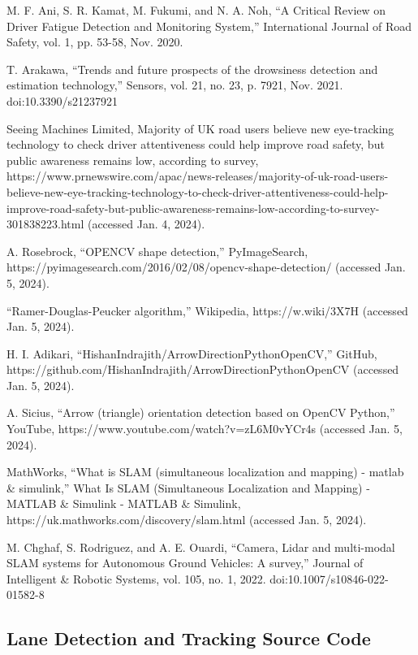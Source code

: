 \documentclass[9pt,conference]{IEEEtran}
\begin{document}
\begin{thebibliography}{00}
     M. F. Ani, S. R. Kamat, M. Fukumi, and N. A. Noh, “A Critical Review on Driver Fatigue Detection and Monitoring System,” International Journal of Road Safety, vol. 1, pp. 53-58, Nov. 2020.

     T. Arakawa, “Trends and future prospects of the drowsiness detection and estimation technology,” Sensors, vol. 21, no. 23, p. 7921, Nov. 2021. doi:10.3390/s21237921

     Seeing Machines Limited, Majority of UK road users believe new eye-tracking technology to check driver attentiveness could help improve road safety, but public awareness remains low, according to survey, https://www.prnewswire.com/apac/news-releases/majority-of-uk-road-users-believe-new-eye-tracking-technology-to-check-driver-attentiveness-could-help-improve-road-safety-but-public-awareness-remains-low-according-to-survey-301838223.html (accessed Jan. 4, 2024).

     A. Rosebrock, “OPENCV shape detection,” PyImageSearch, https://pyimagesearch.com/2016/02/08/opencv-shape-detection/ (accessed Jan. 5, 2024).

     “Ramer-Douglas-Peucker algorithm,” Wikipedia, https://w.wiki/3X7H (accessed Jan. 5, 2024).

     H. I. Adikari, “HishanIndrajith/ArrowDirectionPythonOpenCV,” GitHub, https://github.com/HishanIndrajith/ArrowDirectionPythonOpenCV (accessed Jan. 5, 2024).

     A. Sicius, “Arrow (triangle) orientation detection based on OpenCV Python,” YouTube, https://www.youtube.com/watch?v=zL6M0vYCr4s (accessed Jan. 5, 2024).

     MathWorks, “What is SLAM (simultaneous localization and mapping) - matlab \& simulink,” What Is SLAM (Simultaneous Localization and Mapping) - MATLAB \& Simulink - MATLAB \& Simulink, https://uk.mathworks.com/discovery/slam.html (accessed Jan. 5, 2024).

     M. Chghaf, S. Rodriguez, and A. E. Ouardi, “Camera, Lidar and multi-modal SLAM systems for Autonomous Ground Vehicles: A survey,” Journal of Intelligent \& Robotic Systems, vol. 105, no. 1, 2022. doi:10.1007/s10846-022-01582-8 

\end{thebibliography}

\appendix

\subsection{Lane Detection and Tracking Source Code}
\label{a1}

\end{document}
